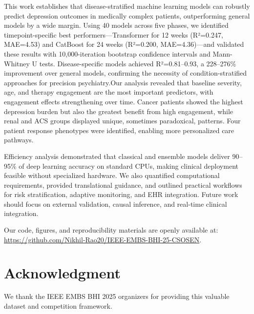 \documentclass[conference]{IEEEtran}
\begin{document}
This work establishes that disease-stratified machine learning models can robustly predict depression outcomes in medically complex patients, outperforming general models by a wide margin. Using 40 models across five phases, we identified timepoint-specific best performers—Transformer for 12 weeks (R²=0.247, MAE=4.53) and CatBoost for 24 weeks (R²=0.200, MAE=4.36)—and validated these results with 10,000-iteration bootstrap confidence intervals and Mann-Whitney U tests. Disease-specific models achieved R²=0.81–0.93, a 228–276\% improvement over general models, confirming the necessity of condition-stratified approaches for precision psychiatry.Our analysis revealed that baseline severity, age, and therapy engagement are the most important predictors, with engagement effects strengthening over time. Cancer patients showed the highest depression burden but also the greatest benefit from high engagement, while renal and ACS groups displayed unique, sometimes paradoxical, patterns. Four patient response phenotypes were identified, enabling more personalized care pathways.

Efficiency analysis demonstrated that classical and ensemble models deliver 90–95\% of deep learning accuracy on standard CPUs, making clinical deployment feasible without specialized hardware. We also quantified computational requirements, provided translational guidance, and outlined practical workflows for risk stratification, adaptive monitoring, and EHR integration. Future work should focus on external validation, causal inference, and real-time clinical integration. 

Our code, figures, and reproducibility materials are openly available at: \href{https://github.com/Nikhil-Rao20/IEEE-EMBS-BHI-25-CSOSEN}{https://github.com/Nikhil-Rao20/IEEE-EMBS-BHI-25-CSOSEN}.


\section*{Acknowledgment}
We thank the IEEE EMBS BHI 2025 organizers for providing this valuable dataset and competition framework.

\end{document}
